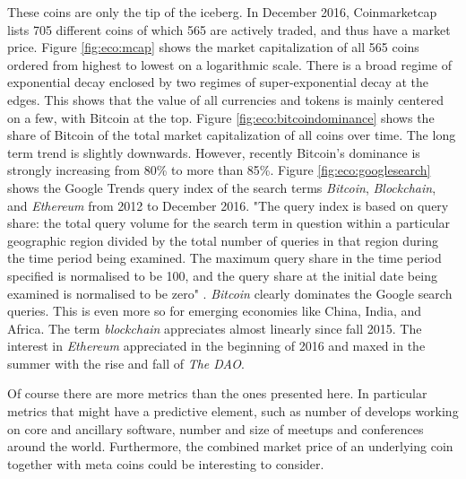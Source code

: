 These coins are only the tip of the iceberg. In December 2016, Coinmarketcap lists 705 different coins of which 565 are actively traded, and thus have a market price. Figure \ref{fig:eco:mcap} shows the market capitalization of all 565 coins ordered from highest to lowest on a logarithmic scale. There is a broad regime of exponential decay enclosed by two regimes of super-exponential decay at the edges. This shows that the value of all currencies and tokens is mainly centered on a few, with Bitcoin at the top. Figure \ref{fig:eco:bitcoindominance} shows the share of Bitcoin of the total market capitalization of all coins over time. The long term trend is slightly downwards. However, recently Bitcoin's dominance is strongly increasing from 80\% to more than 85\%. Figure \ref{fig:eco:googlesearch} shows the Google Trends query index of the search terms \emph{Bitcoin}, \emph{Blockchain}, and \emph{Ethereum} from 2012 to December 2016. "The query index is based on query share: the total query volume for the search term in question within a particular geographic region divided by the total number of queries in that region during the time period being examined. The maximum query share in the time period specified is normalised to be 100, and the query share at the initial date being examined is normalised to be zero" \parencite{ECOR:ECOR809}. \emph{Bitcoin} clearly dominates the Google search queries. This is even more so for emerging economies like China, India, and Africa. The term \emph{blockchain} appreciates almost linearly since fall 2015. The interest in \emph{Ethereum} appreciated in the beginning of 2016 and maxed in the summer with the rise and fall of \emph{The DAO}.

Of course there are more metrics than the ones presented here. In particular metrics that might have a predictive element, such as number of develops working on core and ancillary software, number and size of meetups and conferences around the world. Furthermore, the combined market price of an underlying coin together with meta coins could be interesting to consider. 


